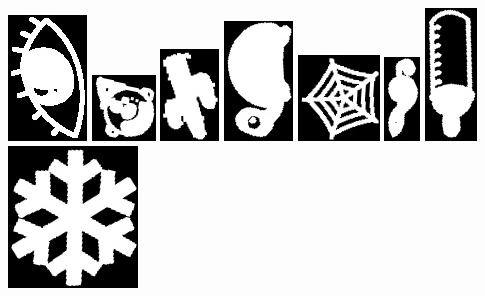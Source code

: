 \documentclass[10pt,a4paper]{article}
\begin{document}
\begin{center}
\includegraphics[scale=0.5]{2.1/sign10.jpg}
\includegraphics[scale=0.5]{2.1/sign11.jpg}
\includegraphics[scale=0.5]{2.1/sign12.jpg}
\includegraphics[scale=0.5]{2.1/sign13.jpg}
\includegraphics[scale=0.5]{2.1/sign14.jpg}
\includegraphics[scale=0.5]{2.1/sign15.jpg}
\includegraphics[scale=0.5]{2.1/sign16.jpg}
\includegraphics[scale=0.5]{2.1/sign17.jpg}
\end{center}
\end{document}
